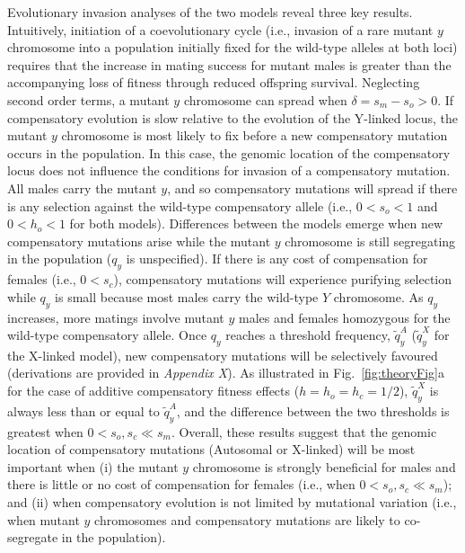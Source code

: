 \documentclass{article}
\begin{document}
Evolutionary invasion analyses of the two models reveal three key results. Intuitively, initiation of a coevolutionary cycle (i.e., invasion of a rare mutant $y$ chromosome into a population initially fixed for the wild-type alleles at both loci) requires that the increase in mating success for mutant males is greater than the accompanying loss of fitness through reduced offspring survival. Neglecting second order terms, a mutant $y$ chromosome can spread when $\delta = s_m - s_o > 0$. If compensatory evolution is slow relative to the evolution of the Y-linked locus, the mutant $y$ chromosome is most likely to fix before a new compensatory mutation occurs in the population. In this case, the genomic location of the compensatory locus does not influence the conditions for invasion of a compensatory mutation. All males carry the mutant $y$, and so compensatory mutations will spread if there is any selection against the wild-type compensatory allele (i.e., $0 < s_o < 1$ and $0 < h_o < 1$ for both models). Differences between the models emerge when new compensatory mutations arise while the mutant $y$ chromosome is still segregating in the population ($q_y$ is unspecified). If there is any cost of compensation for females (i.e., $0 < s_c$), compensatory mutations will experience purifying selection while $q_y$ is small because most males carry the wild-type $Y$ chromosome. As $q_y$ increases, more matings involve mutant $y$ males and females homozygous for the wild-type compensatory allele. Once $q_y$ reaches a threshold frequency, $\tilde{q}^{A}_{y}$ ($\tilde{q}^{X}_{y}$ for the X-linked model), new compensatory mutations will be selectively favoured (derivations are provided in {\itshape Appendix X}). As illustrated in Fig.~\ref{fig:theoryFig}a for the case of additive compensatory fitness effects ($h = h_o = h_c = 1/2$), $\tilde{q}^{X}_{y}$ is always less than or equal to $\tilde{q}^{A}_{y}$, and the difference between the two thresholds is greatest when $0 < s_o,s_c \ll s_m$. Overall, these results suggest that the genomic location of compensatory mutations (Autosomal or X-linked) will be most important when (i) the mutant $y$ chromosome is strongly beneficial for males and there is little or no cost of compensation for females (i.e., when $0 < s_o,s_c \ll s_m$); and (ii) when compensatory evolution is not limited by mutational variation (i.e., when mutant $y$ chromosomes and compensatory mutations are likely to co-segregate in the population). 
\end{document}
